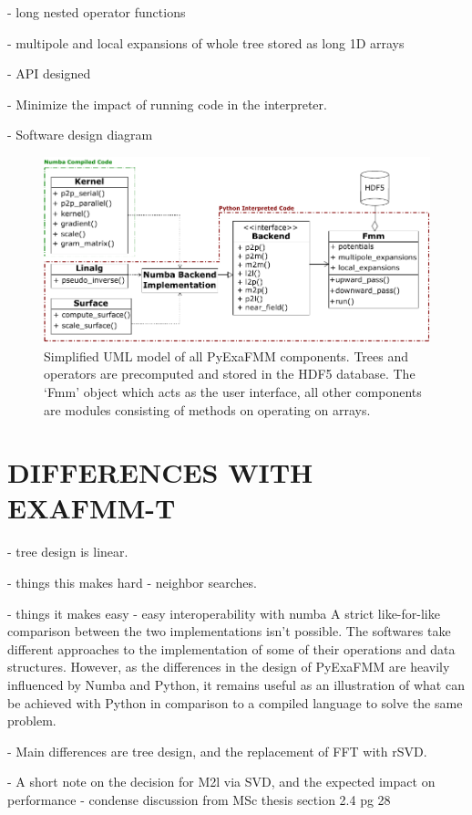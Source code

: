 \documentclass{IEEEcsmag}
\begin{document}
- long nested operator functions

- multipole and local expansions of whole tree stored as long 1D arrays


- API designed

- Minimize the impact of running code in the interpreter.

- Software design diagram

\begin{figure}
    \centerline{\includegraphics {figures/software.pdf}}
    \caption{Simplified UML model of all PyExaFMM components. Trees and operators are precomputed and stored in the HDF5 database. The `Fmm' object which acts as the user interface, all other components are modules consisting of methods on operating on arrays.}
    \label{fig:design}
\end{figure}

\section{DIFFERENCES WITH EXAFMM-T}

- tree design is linear. 

- things this makes hard - neighbor searches.

- things it makes easy - easy interoperability with numba
A strict like-for-like comparison between the two implementations isn't possible. The softwares take different approaches to the implementation of some of their operations and data structures. However, as the differences in the design of PyExaFMM are heavily influenced by Numba and Python, it remains useful as an illustration of what can be achieved with Python in comparison to a compiled language to solve the same problem.

- Main differences are tree design, and the replacement of FFT with rSVD.

- A short note on the decision for M2l via SVD, and the expected impact on performance - condense discussion from MSc thesis section 2.4 pg 28
\end{document}
